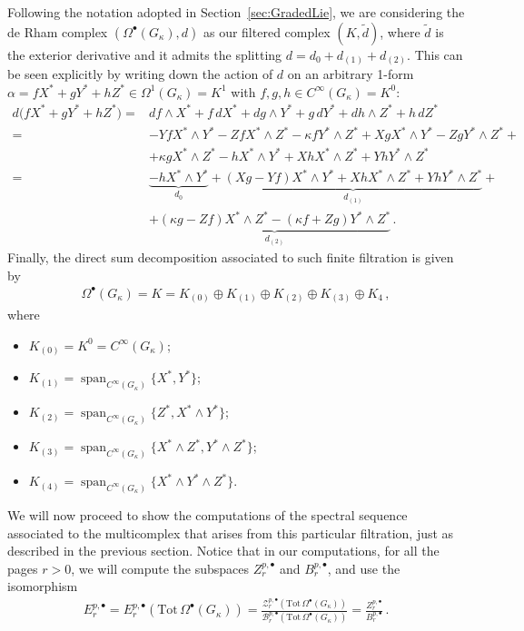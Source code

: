 \documentclass[10pt]{amsart}
\theoremstyle{remark}
\DeclareMathOperator{\spn}{span}
\numberwithin{equation}{section}
\begin{document}
Following the notation adopted in Section~\ref{sec:GradedLie}, we are considering the de Rham complex $(\Omega^\bullet(G_\kappa),d)$ as our filtered complex $(K,\tilde d)$, where $\tilde d$ is the exterior derivative and it admits the splitting $d=d_0+d_{(1)}+d_{(2)}$. This can be seen explicitly by writing down the action of $d$ on an arbitrary 1-form $\alpha=fX^\ast+gY^\ast+hZ^\ast\in\Omega^1(G_\kappa)=K^1$ with $f,g,h\in C^\infty(G_\kappa)=K^0$:
\begin{align*}
    d \big(fX^\ast+gY^\ast+hZ^\ast\big)=&df\wedge X^\ast+f\,dX^\ast+dg\wedge Y^\ast+g\,dY^\ast+dh\wedge Z^\ast+h\,dZ^\ast\\=&-YfX^\ast\wedge Y^\ast-ZfX^\ast\wedge Z^\ast-\kappa fY^\ast\wedge Z^\ast+XgX^\ast\wedge Y^\ast-ZgY^\ast\wedge Z^\ast+\\&+\kappa gX^\ast\wedge Z^\ast-hX^\ast\wedge Y^\ast+XhX^\ast\wedge Z^\ast+YhY^\ast\wedge Z^\ast\\=&\underbrace{-hX^\ast\wedge Y^\ast}_{d_0}+\underbrace{(Xg-Yf)X^\ast\wedge Y^\ast+XhX^\ast\wedge Z^\ast+YhY^\ast\wedge Z^\ast}_{d_{(1)}}+\\&+\underbrace{(\kappa g-Zf)X^\ast\wedge Z^\ast-(\kappa f+Zg)Y^\ast\wedge Z^\ast}_{d_{(2)}}\,.
\end{align*}
Finally, the direct sum decomposition associated to such finite filtration is given by
\begin{align*}
    \Omega^\bullet(G_\kappa)=K=K_{(0)}\oplus K_{(1)}\oplus K_{(2)}\oplus K_{(3)}\oplus K_{4}\,,
\end{align*}
where
\begin{itemize}
    \item $K_{(0)}=K^0=C^\infty(G_\kappa)$;
    \item $K_{(1)}=\spn_{C^\infty(G_\kappa)}\lbrace X^\ast,Y^\ast\rbrace$;
    \item  $K_{(2)}=\spn_{C^\infty(G_\kappa)}\lbrace Z^\ast,X^\ast\wedge Y^\ast\rbrace$;
    \item $K_{(3)}= \spn_{C^\infty(G_\kappa)}\lbrace X^\ast\wedge Z^\ast,Y^\ast\wedge Z^\ast\rbrace$;
    \item $K_{(4)}= \spn_{C^\infty(G_\kappa)}\lbrace X^\ast\wedge Y^\ast\wedge Z^\ast\rbrace$.
\end{itemize}


We will now proceed to show the computations of the spectral sequence associated to the multicomplex that arises from this particular filtration, just as described in the previous section.
Notice that in our computations, for all the pages $r>0$, we will compute the subspaces $Z_r^{p,\bullet}$ and $B_r^{p,\bullet}$, and use the isomorphism
\begin{align*}
    E_r^{p,\bullet}=E_r^{p,\bullet}(\mathrm{Tot}\,\Omega^\bullet(G_\kappa))=\frac{\mathcal{Z}_r^{p,\bullet}(\mathrm{Tot}\,\Omega^\bullet(G_\kappa))}{\mathcal{B}_r^{p,\bullet}(\mathrm{Tot}\,\Omega^\bullet(G_\kappa))}=\frac{Z_r^{p,\bullet}}{B_r^{p,\bullet}}\,.
\end{align*}
\end{document}
